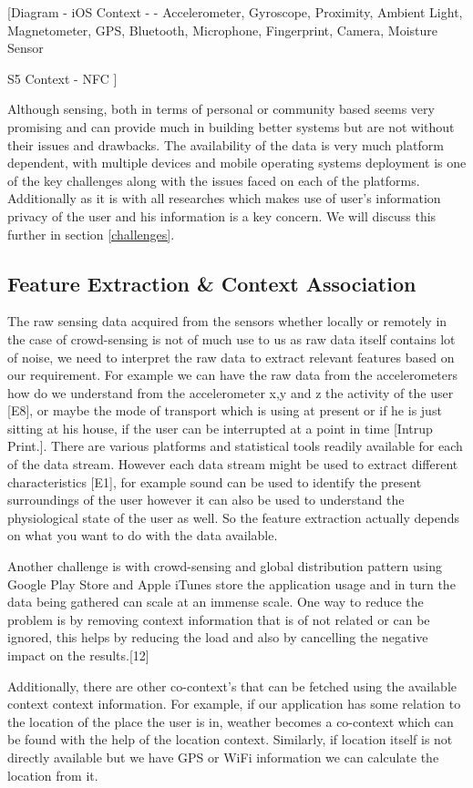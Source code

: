 \documentclass[12pt]{report}
\begin{document}
[Diagram - iOS Context -
- Accelerometer, Gyroscope, Proximity, Ambient Light, Magnetometer, GPS, Bluetooth, Microphone, Fingerprint, Camera, Moisture Sensor

S5 Context - NFC
]

Although sensing, both in terms of personal or community based seems very promising and can provide much in building better systems but are not without their issues and drawbacks. The availability of the data is very much platform dependent, with multiple devices and mobile operating systems deployment is one of the key challenges along with the issues faced on each of the platforms. Additionally as it is with all researches which makes use of user's information privacy of the user and his information is a key concern. We will discuss this further in section \ref{challenges}.

\subsection{Feature Extraction \& Context Association}
The raw sensing data acquired from the sensors whether locally or remotely in the case of crowd-sensing is not of much use to us as raw data itself contains lot of noise, we need to interpret the raw data to extract relevant features based on our requirement. For example we can have the raw data from the accelerometers how do we understand from the accelerometer x,y and z the activity of the user [E8], or maybe the mode of transport which is using at present or if he is just sitting at his house, if the user can be interrupted at a point in time [Intrup Print.]. There are various platforms and statistical tools readily available for each of the data stream. However each data stream might be used to extract different characteristics [E1], for example sound can be used to identify the present surroundings of the user however it can also be used to understand the physiological state of the user as well. So the feature extraction actually depends on what you want to do with the data available.

Another challenge is with crowd-sensing and global distribution pattern using Google Play Store and Apple iTunes store the application usage and in turn the data being gathered can scale at an immense scale. One way to reduce the problem is by removing context information that is of not related or can be ignored, this helps by reducing the load and also by cancelling the negative impact on the results.[12] 

Additionally, there are other co-context's that can be fetched using the available context context information. For example, if our application has some relation to the location of the place the user is in, weather becomes a co-context which can be found with the help of the location context. Similarly, if location itself is not directly available but we have GPS or WiFi information we can calculate the location from it.
\end{document}
